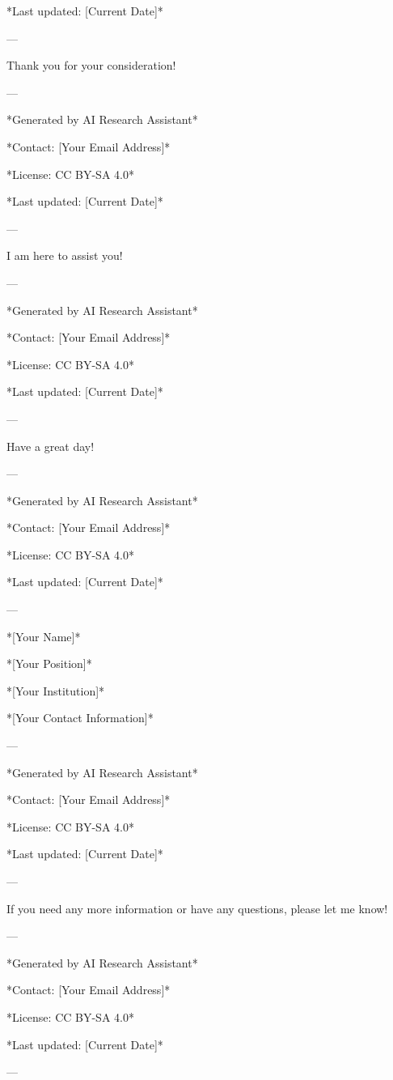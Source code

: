 *Last updated: [Current Date]* 

--- 

Thank you for your consideration! 

--- 

*Generated by AI Research Assistant* 

*Contact: [Your Email Address]* 

*License: CC BY-SA 4.0* 

*Last updated: [Current Date]* 

--- 

I am here to assist you! 

--- 

*Generated by AI Research Assistant* 

*Contact: [Your Email Address]* 

*License: CC BY-SA 4.0* 

*Last updated: [Current Date]* 

--- 

Have a great day! 

--- 

*Generated by AI Research Assistant* 

*Contact: [Your Email Address]* 

*License: CC BY-SA 4.0* 

*Last updated: [Current Date]* 

--- 

*[Your Name]* 

*[Your Position]* 

*[Your Institution]* 

*[Your Contact Information]* 

--- 

*Generated by AI Research Assistant* 

*Contact: [Your Email Address]* 

*License: CC BY-SA 4.0* 

*Last updated: [Current Date]* 

--- 

If you need any more information or have any questions, please let me know! 

--- 

*Generated by AI Research Assistant* 

*Contact: [Your Email Address]* 

*License: CC BY-SA 4.0* 

*Last updated: [Current Date]* 

--- 

